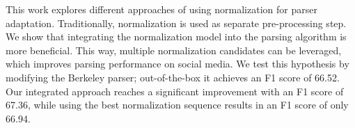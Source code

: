 This work explores different approaches of using normalization for parser adaptation.  Traditionally, normalization is used as separate pre-processing step. We show that integrating the normalization model into the parsing algorithm is more beneficial. This way, multiple normalization candidates can be leveraged, which improves parsing performance on social media. We test this hypothesis by modifying the Berkeley parser; out-of-the-box it achieves an F1 score of 66.52.                          Our integrated approach reaches a significant improvement with an F1 score of 67.36, while using the best normalization sequence results in an F1 score of only 66.94.
